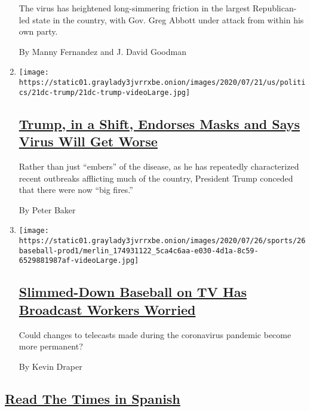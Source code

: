 \begin{enumerate}
  The virus has heightened long-simmering friction in the largest
  Republican-led state in the country, with Gov. Greg Abbott under
  attack from within his own party.

  By Manny Fernandez and J. David Goodman
\item
  \texttt{[image: https://static01.graylady3jvrrxbe.onion/images/2020/07/21/us/politics/21dc-trump/21dc-trump-videoLarge.jpg]}

  \hypertarget{trump-in-a-shift-endorses-masks-and-says-virus-will-get-worse}{%
  \subsection{\texorpdfstring{\href{/2020/07/21/us/politics/trump-coronavirus-masks.html}{Trump,
  in a Shift, Endorses Masks and Says Virus Will Get
  Worse}}{Trump, in a Shift, Endorses Masks and Says Virus Will Get Worse}}\label{trump-in-a-shift-endorses-masks-and-says-virus-will-get-worse}}

  Rather than just ``embers'' of the disease, as he has repeatedly
  characterized recent outbreaks afflicting much of the country,
  President Trump conceded that there were now ``big fires.''

  By Peter Baker
\item
  \texttt{[image: https://static01.graylady3jvrrxbe.onion/images/2020/07/26/sports/26baseball-prod1/merlin\_174931122\_5ca4c6aa-e030-4d1a-8c59-6529881987af-videoLarge.jpg]}

  \hypertarget{slimmed-down-baseball-on-tv-has-broadcast-workers-worried}{%
  \subsection{\texorpdfstring{\href{/2020/07/26/sports/baseball/baseball-tv-camera-operators.html}{Slimmed-Down
  Baseball on TV Has Broadcast Workers
  Worried}}{Slimmed-Down Baseball on TV Has Broadcast Workers Worried}}\label{slimmed-down-baseball-on-tv-has-broadcast-workers-worried}}

  Could changes to telecasts made during the coronavirus pandemic become
  more permanent?

  By Kevin Draper
\end{enumerate}

\hypertarget{read-the-times-in-spanish}{%
\subsection{\texorpdfstring{\protect\hyperlink{}{Read The Times in
Spanish}}{Read The Times in Spanish}}\label{read-the-times-in-spanish}}

